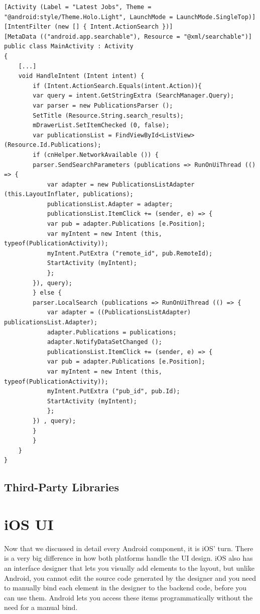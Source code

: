\begin{lstlisting}[frame=lt,caption=MainActivity.cs, label={list:main_ac}]
[Activity (Label = "Latest Jobs", Theme = "@android:style/Theme.Holo.Light", LaunchMode = LaunchMode.SingleTop)]
[IntentFilter (new [] { Intent.ActionSearch })]
[MetaData (("android.app.searchable"), Resource = "@xml/searchable")]
public class MainActivity : Activity
{
	[...]
	void HandleIntent (Intent intent) {
		if (Intent.ActionSearch.Equals(intent.Action)){
		var query = intent.GetStringExtra (SearchManager.Query);
		var parser = new PublicationsParser ();
		SetTitle (Resource.String.search_results);
		mDrawerList.SetItemChecked (0, false);
		var publicationsList = FindViewById<ListView> (Resource.Id.Publications);
		if (cnHelper.NetworkAvailable ()) {
		parser.SendSearchParameters (publications => RunOnUiThread (() => {
			var adapter = new PublicationsListAdapter (this.LayoutInflater, publications);
			publicationsList.Adapter = adapter;
			publicationsList.ItemClick += (sender, e) => {
			var pub = adapter.Publications [e.Position];
			var myIntent = new Intent (this, typeof(PublicationActivity));
			myIntent.PutExtra ("remote_id", pub.RemoteId);
			StartActivity (myIntent);
			};
		}), query);				
		} else {
		parser.LocalSearch (publications => RunOnUiThread (() => {
			var adapter = ((PublicationsListAdapter) publicationsList.Adapter);
			adapter.Publications = publications;
			adapter.NotifyDataSetChanged ();
			publicationsList.ItemClick += (sender, e) => {
			var pub = adapter.Publications [e.Position];
			var myIntent = new Intent (this, typeof(PublicationActivity));
			myIntent.PutExtra ("pub_id", pub.Id);
			StartActivity (myIntent);
			};
		}) , query);
		}			
		}		
	}
}\end{lstlisting} 

\subsection{Third-Party Libraries}



\section{iOS UI}

Now that we discussed in detail every Android component, it is iOS' turn. There is a very big difference in how both platforms handle the \ac{UI} design. iOS also has an interface designer that lets you visually add elements to the layout, but unlike Android, you cannot edit the source code generated by the designer and you need to manually bind each element in the designer to the backend code, before you can use them. Android lets you access these items programmatically without the need for a manual bind.

